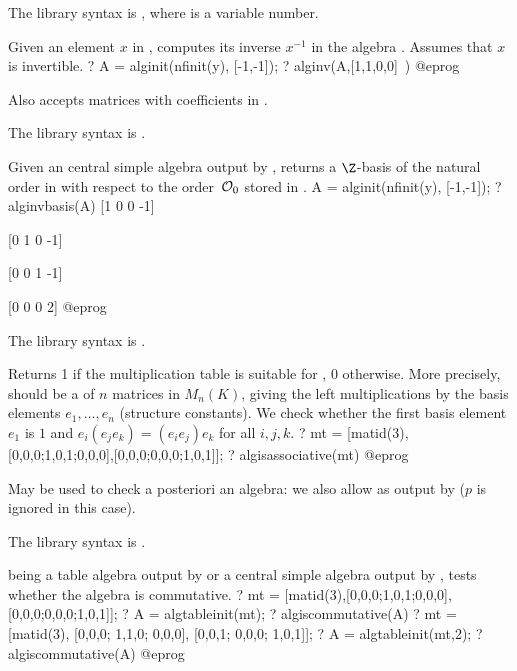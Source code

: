 The library syntax is , where  is a variable number.

\label{se:alginv}
Given an element $x$ in , computes its inverse $x^{-1}$ in the
algebra . Assumes that $x$ is invertible.
\bprog
? A = alginit(nfinit(y), [-1,-1]);
? alginv(A,[1,1,0,0]~)
@eprog

Also accepts matrices with coefficients in .

The library syntax is .

\label{se:alginvbasis}
Given an central simple algebra  output by , returns
a $\Z$-basis of the natural order in  with respect to the order~${\cal
O}_0$ stored in .
\bprog
A = alginit(nfinit(y), [-1,-1]);
? alginvbasis(A)
[1 0 0 -1]

[0 1 0 -1]

[0 0 1 -1]

[0 0 0  2]
@eprog

The library syntax is .

\label{se:algisassociative}
Returns 1 if the multiplication table  is suitable for
, 0 otherwise. More precisely,  should be
a  of $n$ matrices in $M_n(K)$, giving the left multiplications
by the basis elements $e_1, \dots, e_n$ (structure constants).
We check whether the first basis element $e_1$ is $1$ and $e_i(e_je_k) =
(e_ie_j)e_k$ for all $i,j,k$.
\bprog
 ? mt = [matid(3),[0,0,0;1,0,1;0,0,0],[0,0,0;0,0,0;1,0,1]];
 ? algisassociative(mt)
@eprog

May be used to check a posteriori an algebra: we also allow  as
output by  ($p$ is ignored in this case).

The library syntax is .

\label{se:algiscommutative}
 being a table algebra output by  or a central
simple algebra output by , tests whether the algebra  is
commutative.
\bprog
? mt = [matid(3),[0,0,0;1,0,1;0,0,0],[0,0,0;0,0,0;1,0,1]];
? A = algtableinit(mt);
? algiscommutative(A)
? mt = [matid(3), [0,0,0; 1,1,0; 0,0,0], [0,0,1; 0,0,0; 1,0,1]];
? A = algtableinit(mt,2);
? algiscommutative(A)
@eprog

